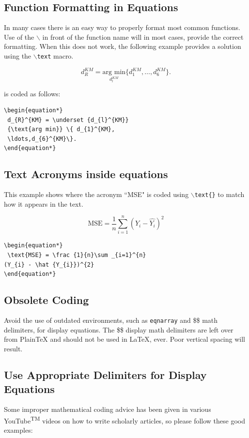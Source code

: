 \documentclass[lettersize,journal]{IEEEtran}
\begin{document}
\subsection{Function Formatting in Equations}
In many cases there is an easy way to properly format most common functions. Use of the $\backslash$ in front of the function name will in most cases, provide the correct formatting. When this does not work, the following example provides a solution using the $\backslash${\tt{text}} macro.

\begin{equation*} 
  d_{R}^{KM} = \underset {d_{l}^{KM}} {\text{arg min}} \{ d_{1}^{KM},\ldots,d_{6}^{KM}\}.
\end{equation*}

\noindent is coded as follows:
\begin{verbatim}
\begin{equation*} 
 d_{R}^{KM} = \underset {d_{l}^{KM}} 
 {\text{arg min}} \{ d_{1}^{KM},
 \ldots,d_{6}^{KM}\}.
\end{equation*}
\end{verbatim}

\subsection{ Text Acronyms inside equations}
\noindent This example shows where the acronym ``MSE" is coded using $\backslash${\tt{text\{\}}} to match how it appears in the text.

\begin{equation*}
 \text{MSE} = \frac {1}{n}\sum _{i=1}^{n}(Y_{i} - \hat {Y_{i}})^{2}
\end{equation*}

\begin{verbatim}
\begin{equation*}
 \text{MSE} = \frac {1}{n}\sum _{i=1}^{n}
(Y_{i} - \hat {Y_{i}})^{2}
\end{equation*}
\end{verbatim}

\subsection{Obsolete Coding}
\noindent Avoid the use of outdated environments, such as {\tt{eqnarray}} and \$\$ math delimiters, for display equations. The \$\$ display math delimiters are left over from PlainTeX and should not be used in \LaTeX, ever. Poor vertical spacing will result.
\subsection{Use Appropriate Delimiters for Display Equations}
\noindent Some improper mathematical coding advice has been given in various YouTube\textsuperscript{TM} videos on how to write scholarly articles, so please follow these good examples:\\
\end{document}
